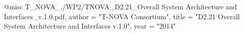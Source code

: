 @misc{ T_NOVA_./WP2/TNOVA_D2.21_Overall System Architecture and Interfaces_v.1.0.pdf,
       author = "T-NOVA Consortium",
       title = "D2.21 Overall System Architecture and Interfaces v.1.0",
       year = "2014" }
